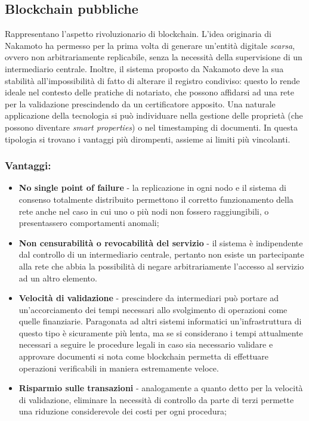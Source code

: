 	\subsection{Blockchain pubbliche}
		Rappresentano l'aspetto rivoluzionario di blockchain. L'idea originaria di Nakamoto ha permesso per la prima volta di generare un'entità digitale \emph{scarsa}, ovvero non arbitrariamente replicabile, senza la necessità della supervisione di un intermediario centrale. Inoltre, il sistema proposto da Nakamoto deve la sua stabilità all'impossibilità di fatto di alterare il registro condiviso: questo lo rende ideale nel contesto delle pratiche di notariato, che possono affidarsi ad una rete per la validazione prescindendo da un certificatore apposito. Una naturale applicazione della tecnologia si può individuare nella gestione delle proprietà (che possono diventare \emph{smart properties}) o nel timestamping di documenti. In questa tipologia si trovano i vantaggi più dirompenti, assieme ai limiti più vincolanti.
		\subsubsection{Vantaggi:}
			\begin{itemize}
				\item \textbf{No single point of failure} - la replicazione in ogni nodo e il sistema di consenso totalmente distribuito permettono il corretto funzionamento della rete anche nel caso in cui uno o più nodi non fossero raggiungibili, o presentassero comportamenti anomali;
				\item \textbf{Non censurabilità o revocabilità del servizio} - il sistema è indipendente dal controllo di un intermediario centrale, pertanto non esiste un partecipante alla rete che abbia la possibilità di negare arbitrariamente l'accesso al servizio ad un altro elemento.
				\item \textbf{Velocità di validazione} - prescindere da intermediari può portare ad un'accorciamento dei tempi necessari allo svolgimento di operazioni come quelle finanziarie. Paragonata ad altri sistemi informatici un'infrastruttura di questo tipo è sicuramente più lenta, ma se si considerano i tempi attualmente necessari a seguire le procedure legali in caso sia necessario validare e approvare documenti si nota come blockchain permetta di effettuare operazioni verificabili in maniera estremamente veloce.
				\item \textbf{Risparmio sulle transazioni} - analogamente a quanto detto per la velocità di validazione, eliminare la necessità di controllo da parte di terzi permette una riduzione considerevole dei costi per ogni procedura;
			\end{itemize}
